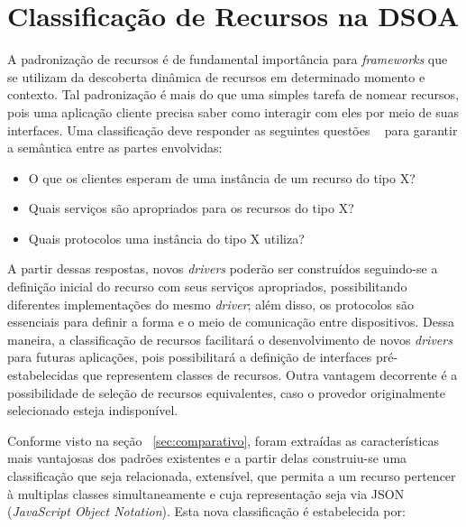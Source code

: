 \chapter{Classificação de Recursos na DSOA}

A padronização de recursos é de fundamental importância para \emph{frameworks} que se utilizam da descoberta dinâmica de recursos em determinado momento e contexto. Tal padronização é mais do que uma simples tarefa de nomear recursos, pois uma aplicação cliente precisa saber como interagir com eles por meio de suas interfaces. Uma classificação deve responder as seguintes questões ~\cite{pervasiveComputing} para garantir a semântica entre as partes envolvidas:

\begin{itemize}
	\item O que os clientes esperam de uma instância de um recurso do tipo X?

	\item Quais serviços são apropriados para os recursos do tipo X?

	\item Quais protocolos uma instância do tipo X utiliza?
\end{itemize}

A partir dessas respostas, novos \emph{drivers} poderão ser construídos seguindo-se a definição inicial do recurso com seus serviços apropriados, possibilitando diferentes implementações do mesmo \emph{driver}; além disso, os protocolos são essenciais para definir a forma e o meio de comunicação entre dispositivos. Dessa maneira, a classificação de recursos facilitará o desenvolvimento de novos \emph{drivers} para futuras aplicações, pois possibilitará a definição de interfaces pré-estabelecidas que representem classes de recursos. Outra vantagem decorrente é a possibilidade de seleção de recursos equivalentes, caso o provedor originalmente selecionado esteja indisponível.

Conforme visto na seção ~\ref{sec:comparativo}, foram extraídas as características mais vantajosas dos padrões existentes e a partir delas construiu-se uma classificação que seja relacionada, extensível, que permita a um recurso pertencer à multiplas classes simultaneamente e cuja representação seja via JSON (\emph{JavaScript Object Notation}). Esta nova classificação é estabelecida por:

